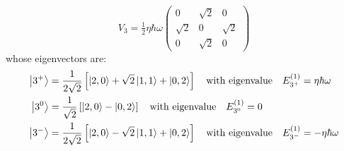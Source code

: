 \documentclass[12pt]{extarticle}
\begin{document}
\[ V_3 = \tfrac{1}{2} \eta \hbar \omega \begin{pmatrix}
0 & \sqrt{2} & 0 \\
\sqrt{2} & 0 & \sqrt{2} \\
0 & \sqrt{2} & 0
\end{pmatrix}\]
whose eigenvectors are:
\begin{align*}
\left| 3^+ \right> & = \frac{1}{2\sqrt{2}} \left[ \left| 2,0 \right> + \sqrt{2} \left| 1,1 \right> + \left| 0,2 \right> \right] \quad \text{with eigenvalue} \quad E^{(1)}_{3^+} = \eta \hbar \omega \\ 
\left| 3^0 \right> & = \frac{1}{\sqrt{2}} \left[ \left| 2,0 \right> - \left| 0,2 \right> \right] \quad \text{with eigenvalue} \quad E^{(1)}_{3^0} = 0 \\ 
\left| 3^- \right> & = \frac{1}{2\sqrt{2}} \left[ \left| 2,0 \right> - \sqrt{2} \left| 1,1 \right> + \left| 0,2 \right> \right] \quad \text{with eigenvalue} \quad E^{(1)}_{3^-} = - \eta \hbar \omega 
\end{align*}
\end{document}
